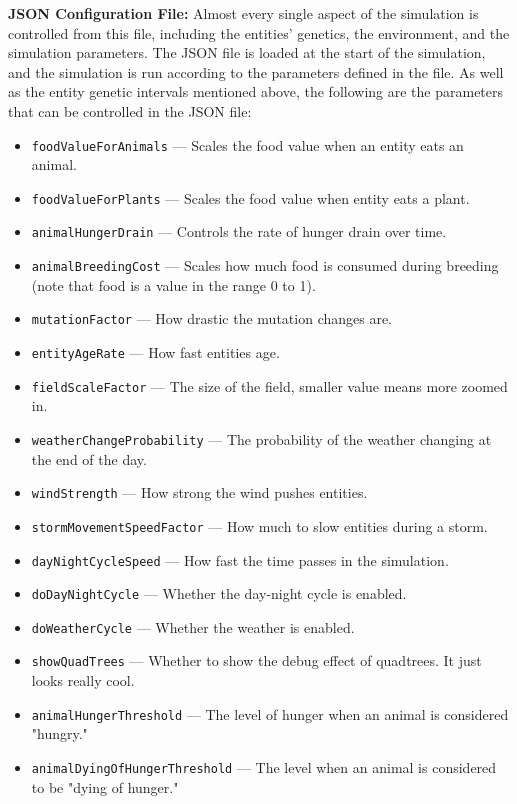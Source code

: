 \documentclass[10pt, a4paper]{scrartcl}
\begin{document}
\begin{multicols}{2}
        \noindent \textbf{JSON Configuration File: } Almost every single aspect of the simulation is controlled from this file,
        including the entities' genetics, the environment, and the simulation parameters. The JSON file is loaded at the start
        of the simulation, and the simulation is run according to the parameters defined in the file. As well as the entity
        genetic intervals mentioned above, the following are the parameters that can be controlled in the JSON file:
        \begin{itemize}
            \item \verb|foodValueForAnimals| — Scales the food value when an entity eats an animal.
            \item \verb|foodValueForPlants| — Scales the food value when entity eats a plant.
            \item \verb|animalHungerDrain| — Controls the rate of hunger drain over time.
            \item \verb|animalBreedingCost| — Scales how much food is consumed during breeding (note that food is a value
            in the range 0 to 1).
            \item \verb|mutationFactor| — How drastic the mutation changes are.
            \item \verb|entityAgeRate| — How fast entities age.
            \item \verb|fieldScaleFactor| — The size of the field, smaller value means more zoomed in.
            \item \verb|weatherChangeProbability| — The probability of the weather changing at the end of the day.
            \item \verb|windStrength| — How strong the wind pushes entities.
            \item \verb|stormMovementSpeedFactor| — How much to slow entities during a storm.
            \item \verb|dayNightCycleSpeed| — How fast the time passes in the simulation.
            \item \verb|doDayNightCycle| — Whether the day-night cycle is enabled.
            \item \verb|doWeatherCycle| — Whether the weather is enabled.
            \item \verb|showQuadTrees| — Whether to show the debug effect of quadtrees. It just looks really cool.
            \item \verb|animalHungerThreshold| — The level of hunger when an animal is considered "hungry."
            \item \verb|animalDyingOfHungerThreshold| — The level when an animal is considered to be "dying of hunger."
        \end{itemize}


\end{multicols}
\end{document}
